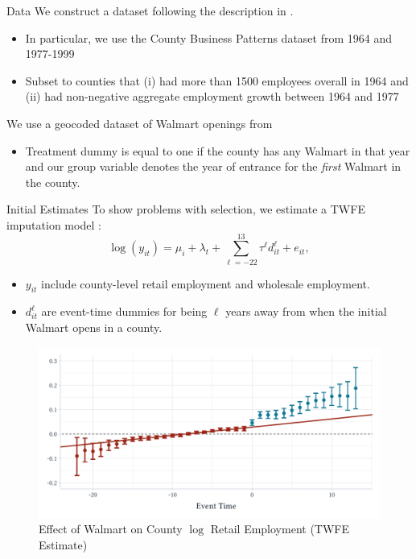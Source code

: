 \documentclass[aspectratio=169,t,11pt]{beamer}
\begin{document}
\begin{frame}{Data}
  We construct a dataset following the description in .

  \begin{itemize}
    \item In particular, we use the County Business Patterns dataset from 1964 and 1977-1999
    \item Subset to counties that (i) had more than 1500 employees overall in 1964 and (ii) had non-negative aggregate employment growth between 1964 and 1977
  \end{itemize}

  \smallskip\pause
  We use a geocoded dataset of Walmart openings from 

  \begin{itemize}
    \item Treatment dummy is equal to one if the county has any Walmart in that year and our group variable denotes the year of entrance for the \emph{first} Walmart in the county.
  \end{itemize}
\end{frame}

\begin{frame}{Initial Estimates}
  To show problems with selection, we estimate a TWFE imputation model :
  \begin{equation}
      \log(y_{it}) = \mu_i + \lambda_t + \sum_{\ell = -22}^{13} \tau^\ell d_{it}^\ell + e_{it},
  \end{equation}
  \begin{itemize}
    \item $y_{it}$ include county-level retail employment and wholesale employment.
    \item $d_{it}^\ell$ are event-time dummies for being $\ell$ years away from when the initial Walmart opens in a county.
  \end{itemize}
\end{frame}

\begin{frame}
  \begin{figure}
    \caption{Effect of Walmart on County $\log$ Retail Employment (TWFE Estimate)}
    \begin{adjustbox}{width=0.85\textwidth}
      \includegraphics{../figures/did2s_retail.pdf}
    \end{adjustbox}
  \end{figure}
\end{frame}
\end{document}
